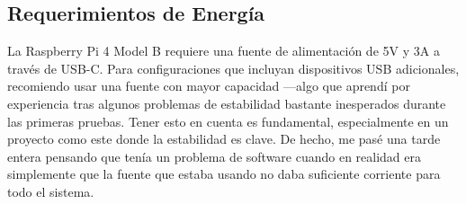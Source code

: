     \subsection{Requerimientos de Energía}
    La Raspberry Pi 4 Model B requiere una fuente de alimentación de 5V y 3A a través de USB-C. Para configuraciones que incluyan dispositivos USB adicionales, recomiendo usar una fuente con mayor capacidad —algo que aprendí por experiencia tras algunos problemas de estabilidad bastante inesperados durante las primeras pruebas. Tener esto en cuenta es fundamental, especialmente en un proyecto como este donde la estabilidad es clave. De hecho, me pasé una tarde entera pensando que tenía un problema de software cuando en realidad era simplemente que la fuente que estaba usando no daba suficiente corriente para todo el sistema.

